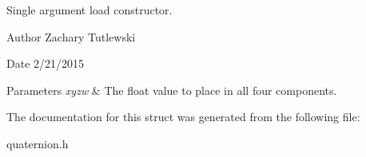 Single argument load constructor. 

\begin{DoxyAuthor}{Author}
Zachary Tutlewski 
\end{DoxyAuthor}
\begin{DoxyDate}{Date}
2/21/2015
\end{DoxyDate}

\begin{DoxyParams}{Parameters}
{\em xyzw} & The float value to place in all four components. \\
\hline
\end{DoxyParams}


The documentation for this struct was generated from the following file\+:\begin{DoxyCompactItemize}
\item 
quaternion.\+h\end{DoxyCompactItemize}
